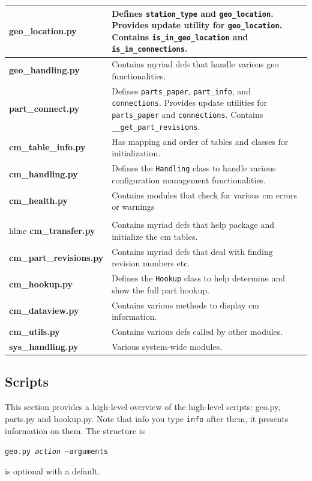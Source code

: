 \documentclass{article}
\begin{document}
\begin{tabular}{l p{12cm}}
{\bf geo\_location.py} & Defines {\tt station\_type} and {\tt geo\_location}.  Provides update utility for {\tt geo\_location}.  Contains {\tt is\_in\_geo\_location} and {\tt is\_in\_connections}. \\ \hline
{\bf geo\_handling.py} & Contains myriad defs that handle various geo functionalities.\\ \hline
{\bf part\_connect.py} & Defines {\tt parts\_paper}, {\tt part\_info}, and {\tt connections}.  Provides update utilities for {\tt parts\_paper} and {\tt connections}. Contains {\tt \_\_get\_part\_revisions}. \\ \hline
{\bf cm\_table\_info.py} & Has mapping and order of tables and classes for initialization. \\ \hline
{\bf cm\_handling.py} & Defines the {\tt Handling} class to handle various configuration management functionalities.\\ \hline
{\bf cm\_health.py} & Contains modules that check for various cm errors or warnings \\ \\hline
{\bf cm\_transfer.py} & Contains myriad defs that help package and initialize the cm tables.\\ \hline
{\bf cm\_part\_revisions.py} & Contains myriad defs that deal with finding revision numbers etc.\\ \hline
{\bf cm\_hookup.py} & Defines the {\tt Hookup} class to help determine and show the full part hookup.\\ \hline
{\bf cm\_dataview.py} & Contains various methods to display cm information.\\ \hline
{\bf cm\_utils.py} & Contains various defs called by other modules.\\ \hline
{\bf sys\_handling.py} & Various system-wide modules.
\end{tabular}

\subsection{Scripts}
\label{sec:scripts}
This section provides a high-level overview of the high-level scripts:  geo.py,  parts.py and hookup.py.  Note that info you type {\tt info} after them, it presents information on them.  The structure is 

{\tt geo.py {\it action} --arguments}

 is optional with a default.
\end{document}

